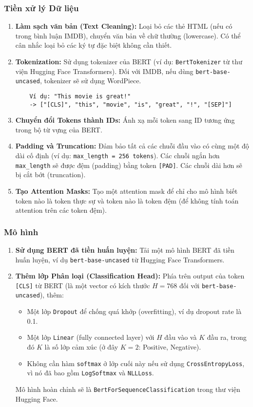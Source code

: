 \subsubsection{Tiền xử lý Dữ liệu}
\begin{enumerate}
    \item \textbf{Làm sạch văn bản (Text Cleaning):} Loại bỏ các thẻ HTML (nếu có trong bình luận IMDB), chuyển văn bản về chữ thường (lowercase). Có thể cân nhắc loại bỏ các ký tự đặc biệt không cần thiết.
    \item \textbf{Tokenization:} Sử dụng tokenizer của BERT (ví dụ: \texttt{BertTokenizer} từ thư viện Hugging Face Transformers). Đối với IMDB, nếu dùng \texttt{bert-base-uncased}, tokenizer sẽ sử dụng WordPiece.
    \begin{verbatim}
    Ví dụ: "This movie is great!" 
    -> ["[CLS]", "this", "movie", "is", "great", "!", "[SEP]"]
    \end{verbatim}
    \item \textbf{Chuyển đổi Tokens thành IDs:} Ánh xạ mỗi token sang ID tương ứng trong bộ từ vựng của BERT.
    \item \textbf{Padding và Truncation:} Đảm bảo tất cả các chuỗi đầu vào có cùng một độ dài cố định (ví dụ: \texttt{max\_length = 256 tokens}). Các chuỗi ngắn hơn \texttt{max\_length} sẽ được đệm (padding) bằng token \texttt{[PAD]}. Các chuỗi dài hơn sẽ bị cắt bớt (truncation). %
    \item \textbf{Tạo Attention Masks:} Tạo một attention mask để chỉ cho mô hình biết token nào là token thực sự và token nào là token đệm (để không tính toán attention trên các token đệm).
\end{enumerate}

\subsubsection{Mô hình}
\begin{enumerate}
    \item \textbf{Sử dụng BERT đã tiền huấn luyện:} Tải một mô hình BERT đã tiền huấn luyện, ví dụ \texttt{bert-base-uncased} từ Hugging Face Transformers.
    \item \textbf{Thêm lớp Phân loại (Classification Head):}
    Phía trên output của token \texttt{[CLS]} từ BERT (là một vector có kích thước $H=768$ đối với \texttt{bert-base-uncased}), thêm:
    \begin{itemize}
        \item Một lớp \texttt{Dropout} để chống quá khớp (overfitting), ví dụ dropout rate là 0.1.
        \item Một lớp \texttt{Linear} (fully connected layer) với $H$ đầu vào và $K$ đầu ra, trong đó $K$ là số lớp cảm xúc (ở đây $K=2$: Positive, Negative).
        \item Không cần hàm \texttt{softmax} ở lớp cuối này nếu sử dụng \texttt{CrossEntropyLoss}, vì nó đã bao gồm \texttt{LogSoftmax} và \texttt{NLLLoss}.
    \end{itemize}
    Mô hình hoàn chỉnh sẽ là \texttt{BertForSequenceClassification} trong thư viện Hugging Face.
\end{enumerate}

